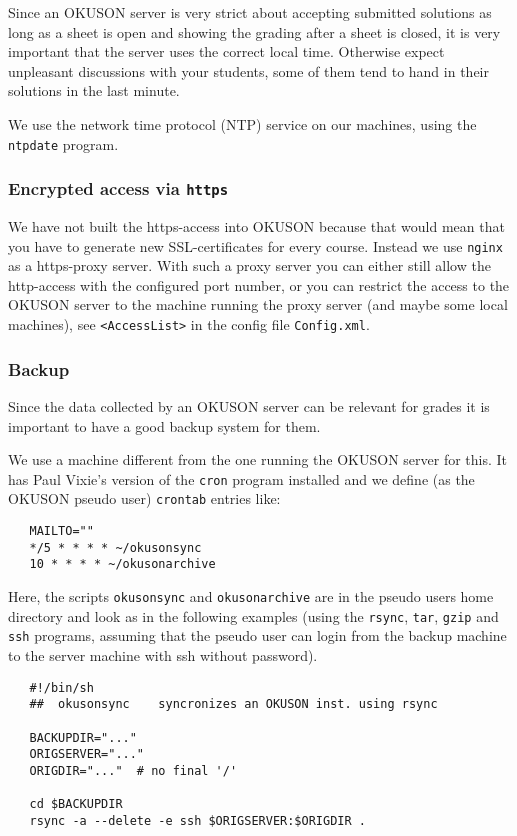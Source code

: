 \documentclass[12pt,openany,a4paper]{book}
\newcommand{\OKUSON}{\textsf{OKUSON}}
\begin{document}
Since an {\OKUSON} server is very strict about accepting submitted solutions
as long as a sheet is open and showing the grading after a sheet is closed,
it is very important that the server uses the correct local time. Otherwise
expect unpleasant discussions with your students, some of them tend to hand
in their solutions in the last minute.

We use the network time protocol (NTP) service on our machines, using the
\texttt{ntpdate} program.

\subsubsection*{Encrypted access via \texttt{https}}

We have not built the https-access into {\OKUSON} because that would mean
that you have to generate new SSL-certificates for every course. Instead we
use \texttt{nginx} as a https-proxy server. With such a proxy server
you can either still allow the http-access with the configured port number,
or you can restrict the access to the {\OKUSON} server to the machine
running the proxy server (and maybe some local machines), see
\texttt{<AccessList>} in the config file \texttt{Config.xml}.


\subsubsection*{Backup}

Since the data collected by an {\OKUSON} server can be relevant for grades
it is important to have a good backup system for them.  

We use a machine different from the one running the {\OKUSON} server for
this. It has Paul Vixie's version of the \texttt{cron} program installed and 
we define (as the {\OKUSON} pseudo user) \texttt{crontab} entries like:

\begin{verbatim}
   MAILTO=""
   */5 * * * * ~/okusonsync 
   10 * * * * ~/okusonarchive
\end{verbatim}

Here, the scripts \texttt{okusonsync} and \texttt{okusonarchive} are in the
pseudo users home directory and look as in the following examples (using the
\texttt{rsync}, \texttt{tar}, \texttt{gzip} and \texttt{ssh} programs,
assuming that the pseudo user can login from the backup machine to the
server machine with ssh without password).

\begin{verbatim}
   #!/bin/sh
   ##  okusonsync    syncronizes an OKUSON inst. using rsync

   BACKUPDIR="..."
   ORIGSERVER="..."
   ORIGDIR="..."  # no final '/'

   cd $BACKUPDIR
   rsync -a --delete -e ssh $ORIGSERVER:$ORIGDIR .
\end{verbatim}
\end{document}
